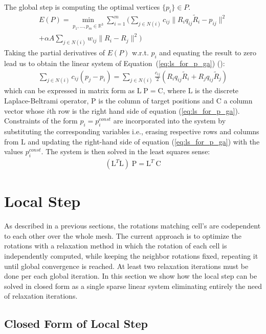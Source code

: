 \documentclass{birkjour}
\numberwithin{equation}{section}
\begin{document}
The global step is computing the optimal vertices $\{p_i\} \in P$.
\begin{eqnarray*}
E(P) = \min_{p_1,...,p_m \in \mathbb R^3} \sum_{i=1}^m  (  \sum_{j \in N(i)} { c_{ij} \|R_i q_{ij} \tilde R_i -  p_{ij}\|^2 } \\
+ \alpha A \sum_{j \in N(i)} { w_{ij} \|R_i - R_j\|^2 } )
\end{eqnarray*}
Taking the partial derivatives of $E(P)$ w.r.t. $p_i$ and equating the result to zero lead us to obtain the linear system of Equation~(\ref{eq:ls_for_p_ga}) (\cite{Lopez2013}):
\begin{eqnarray}
\label{eq:ls_for_p_ga}
\sum_{j \in N(i)} { c_{ij} (p_j - p_i) } = \sum_{j \in N(i)} { \frac{c_{ij}}{2} (R_i q_{ij} \tilde  R_i + R_j q_{ij} \tilde R_j) }
\end{eqnarray}
which can be expressed in matrix form as $\mathrm L \; \mathrm P = \mathrm C$, where $\mathrm L$ is the discrete Laplace-Beltrami operator, $\mathrm P$ is the column of target positions and $\mathrm C$ a column vector whose $i$th row is the right hand side of equation (\ref{eq:ls_for_p_ga}). Constraints of the form $p_i = p^{const}_i$ are incorporated into the system by substituting the corresponding variables i.e., erasing respective rows and columns from $\mathrm L$ and updating the right-hand side of equation (\ref{eq:ls_for_p_ga}) with the values $p^{const}_i$. The system is then solved in the least squares sense:
\begin{eqnarray}
(\mathrm L^T \mathrm L) \; \mathrm P = \mathrm L^T \ \mathrm C
\end{eqnarray}

\section{Local Step}

As described in a previous sections, the rotations matching cell's are codependent to each other over the whole mesh. The current approach is to optimize the rotations with a relaxation method in which the rotation of each cell is independently computed, while keeping the neighbor rotations fixed, repeating it until global convergence is reached. At least two relaxation iterations must be done per each global iteration. In this section we show how the local step can be solved in closed form as a single sparse linear system eliminating entirely the need of relaxation iterations.

\subsection{Closed Form of Local Step}
\end{document}

